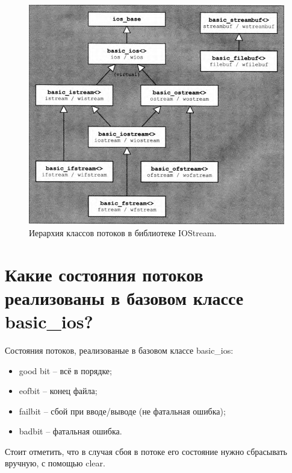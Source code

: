 \documentclass[a4paper,12pt]{article}	%
\begin{document}
	\begin{figure}[h!]
		\begin{center}
			\includegraphics[scale = 0.4]{fig2}
			\caption{Иерархия классов потоков в библиотеке IOStream.}
			\label{fig2}
		\end{center}
	\end{figure}

\section{Какие состояния потоков реализованы в базовом классе basic\_ios?}

	Состояния потоков, реализованые в базовом классе basic\_ios:
	
	\begin{itemize}
	
		\item good bit -- всё в порядке;
		
		\item eofbit -- конец файла;
		
		\item failbit -- сбой при вводе/выводе (не фатальная ошибка);
				
		\item badbit -- фатальная ошибка.	
	
	\end{itemize}

	Стоит отметить, что в случая сбоя в потоке его состояние нужно сбрасывать вручную, с помощью clear.
\end{document}

